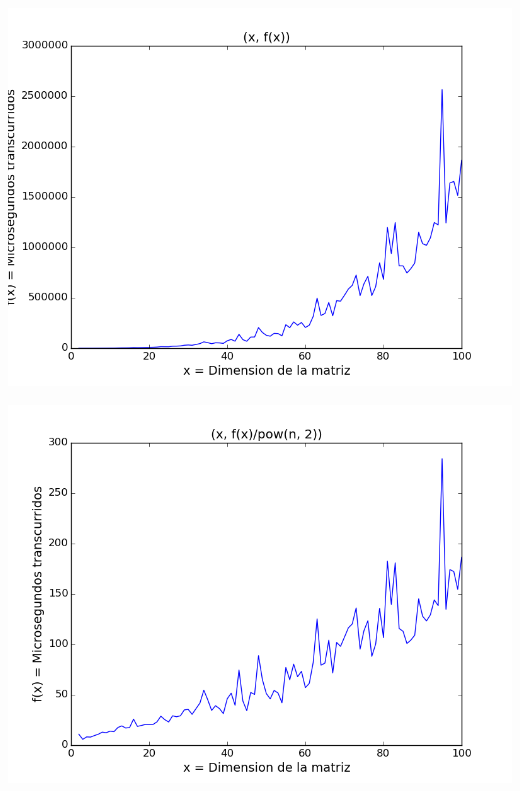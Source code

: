 \begin{center}
\includegraphics[scale=0.54]{images/4potenciafuncion}
\end{center}


\begin{center}
\includegraphics[scale=0.54]{images/4potenciasobrecuadrado}
\end{center}


